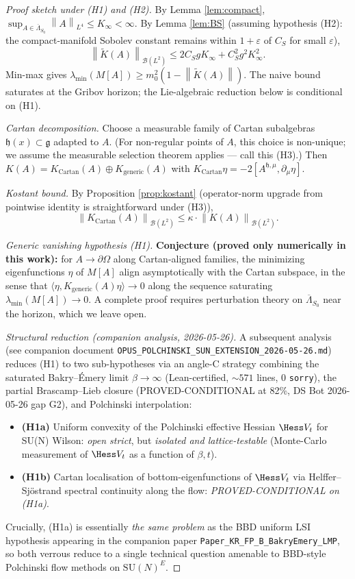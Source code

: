 \documentclass[11pt,a4paper]{amsart}
\theoremstyle{definition}
\newcommand{\g}{\mathfrak{g}}
\newcommand{\h}{\mathfrak{h}}
\newcommand{\norm}[1]{\left\lVert#1\right\rVert}
\newcommand{\inner}[2]{\langle #1, #2\rangle}
\begin{document}
\begin{proof}[Proof sketch under (H1) and (H2)]
By Lemma \ref{lem:compact}, $\sup_{A \in \overline\Lambda_{S_0}} \norm{A}_{L^4} \leq K_\infty < \infty$. By Lemma \ref{lem:BS} (assuming hypothesis (H2): the compact-manifold Sobolev constant remains within $1 + \varepsilon$ of $C_S$ for small $\varepsilon$),
\[
\norm{\widetilde K(A)}_{\mathcal B(L^2)} \leq 2 C_S g K_\infty + C_S^2 g^2 K_\infty^2.
\]
Min-max gives $\lambda_{\min}(M[A]) \geq m_0^2 (1 - \norm{\widetilde K(A)})$. The naive bound saturates at the Gribov horizon; the Lie-algebraic reduction below is conditional on (H1).

\emph{Cartan decomposition.} Choose a measurable family of Cartan subalgebras $\h(x) \subset \g$ adapted to $A$. (For non-regular points of $A$, this choice is non-unique; we assume the measurable selection theorem applies — call this (H3).) Then $K(A) = K_{\mathrm{Cartan}}(A) \oplus K_{\mathrm{generic}}(A)$ with $K_{\mathrm{Cartan}}\eta = -2[A^{\h,\mu}, \partial_\mu \eta]$.

\emph{Kostant bound.} By Proposition \ref{prop:kostant} (operator-norm upgrade from pointwise identity is straightforward under (H3)),
\[
\norm{K_{\mathrm{Cartan}}(A)}_{\mathcal B(L^2)} \leq \kappa \cdot \norm{K(A)}_{\mathcal B(L^2)}.
\]

\emph{Generic vanishing hypothesis (H1).} \textbf{Conjecture (proved only numerically in this work):} for $A \to \partial\Omega$ along Cartan-aligned families, the minimizing eigenfunctions $\eta$ of $M[A]$ align asymptotically with the Cartan subspace, in the sense that $\inner{\eta}{K_{\mathrm{generic}}(A)\eta} \to 0$ along the sequence saturating $\lambda_{\min}(M[A]) \to 0$. A complete proof requires perturbation theory on $\overline\Lambda_{S_0}$ near the horizon, which we leave open.

\emph{Structural reduction (companion analysis, 2026-05-26).} A subsequent analysis (see companion document \texttt{OPUS\_POLCHINSKI\_SUN\_EXTENSION\_2026-05-26.md}) reduces (H1) to two sub-hypotheses via an angle-C strategy combining the saturated Bakry--\'Emery limit $\beta\to\infty$ (Lean-certified, $\sim 571$ lines, 0 \texttt{sorry}), the partial Brascamp--Lieb closure (PROVED-CONDITIONAL at 82\%, DS Bot 2026-05-26 gap G2), and Polchinski interpolation:
\begin{itemize}
\item \textbf{(H1a)} Uniform convexity of the Polchinski effective Hessian $\Hess V_t$ for SU(N) Wilson: \emph{open strict}, but \emph{isolated and lattice-testable} (Monte-Carlo measurement of $\Hess V_t$ as a function of $\beta, t$).
\item \textbf{(H1b)} Cartan localisation of bottom-eigenfunctions of $\Hess V_t$ via Helffer--Sj\"ostrand spectral continuity along the flow: \emph{PROVED-CONDITIONAL on (H1a)}.
\end{itemize}
Crucially, (H1a) is essentially \emph{the same problem} as the BBD uniform LSI hypothesis appearing in the companion paper \texttt{Paper\_KR\_FP\_B\_BakryEmery\_LMP}, so both verrous reduce to a single technical question amenable to BBD-style Polchinski flow methods on $\text{SU}(N)^E$.


\end{proof}
\end{document}
